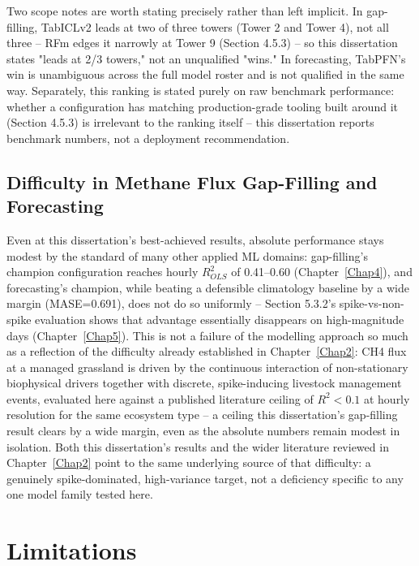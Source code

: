Two scope notes are worth stating precisely rather than left implicit. In gap-filling, TabICLv2
leads at two of three towers (Tower 2 and Tower 4), not all three -- RFm edges it narrowly at Tower
9 (Section 4.5.3) -- so this dissertation states "leads at 2/3 towers," not an unqualified "wins."
In forecasting, TabPFN's win is unambiguous across the full model roster and is not qualified in the
same way. Separately, this ranking is stated purely on raw benchmark performance: whether a
configuration has matching production-grade tooling built around it (Section 4.5.3) is irrelevant
to the ranking itself -- this dissertation reports benchmark numbers, not a deployment
recommendation.

\subsection{Difficulty in Methane Flux Gap-Filling and Forecasting}

Even at this dissertation's best-achieved results, absolute performance stays modest by the standard
of many other applied ML domains: gap-filling's champion configuration reaches hourly $R^2_{OLS}$ of
0.41--0.60 (Chapter~\ref{Chap4}), and forecasting's champion, while beating a defensible climatology
baseline by a wide margin (MASE=0.691), does not do so uniformly -- Section 5.3.2's spike-vs-non-spike
evaluation shows that advantage essentially disappears on high-magnitude days (Chapter~\ref{Chap5}).
This is not a failure of the modelling approach so much as a
reflection of the difficulty already established in Chapter~\ref{Chap2}: CH4 flux at a managed
grassland is driven by the continuous interaction of non-stationary biophysical drivers together
with discrete, spike-inducing livestock management events, evaluated here against a published
literature ceiling of $R^2<0.1$ at hourly resolution for the same ecosystem type -- a ceiling this
dissertation's gap-filling result clears by a wide margin, even as the absolute numbers remain
modest in isolation. Both this dissertation's results and the wider literature reviewed in
Chapter~\ref{Chap2} point to the same underlying source of that difficulty: a genuinely
spike-dominated, high-variance target, not a deficiency specific to any one model family tested
here.

\section{Limitations}

